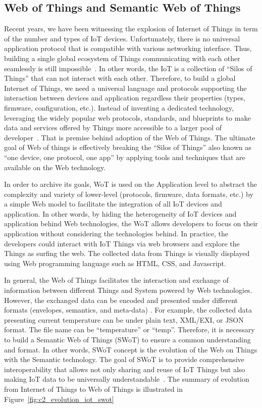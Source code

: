 \subsection{Web of Things and Semantic Web of Things}
Recent years, we have been witnessing the explosion of Internet of Things in term of the number and types of IoT devices. Unfortunately, there is no universal application protocol that is compatible with various networking interface. Thus, building a single global ecosystem of Things communicating with each other seamlessly is still impossible~\cite{WebofThi19:online}. In other words, the IoT is a collection of ``Silos of Things'' that can not interact with each other. Therefore, to build a global Internet of Things, we need a universal language and protocols supporting the interaction between devices and application regardless their properties (types, firmware, configuration, etc.). Instead of inventing a dedicated technology, leveraging the widely popular web protocols, standards, and blueprints to make data and services offered by Things more accessible to a larger pool of developer~\cite{guinard2016building}. That is premise behind adoption of the Web of Things. The ultimate goal of Web of things is effectively breaking the ``Silos of Things'' also known as ``one device, one protocol, one app'' by applying tools and techniques that are available on the Web technology.

In order to archive its goals, WoT is used on the Application level to abstract the complexity and variety of lower-level (protocols, firmware, data formats, etc.) by a simple Web model to facilitate the integration of all IoT devices and application. In other words, by hiding the heterogeneity of IoT devices and application behind Web technologies, the WoT allows developers to focus on their application without considering the technologies behind. In practice, the developers could interact with IoT Things via web browsers and explore the Things as surfing the web. The collected data from Things is visually displayed using Web programming language such as HTML, CSS, and Javascript. 

In general, the Web of Things facilitates the interaction and exchange of information between different Things and System powered by Web technologies. However, the exchanged data can be encoded and presented under different formats (envelopes, semantics, and meta-data) . For example, the collected data presenting current temperature can be under plain text, XML/EXI, or JSON format. The file name can be ``temperature'' or ``temp''. Therefore, it is necessary to build a Semantic Web of Things (SWoT) to ensure a common understanding and format. In other words, SWoT concept is the evolution of the Web on Things with the Semantic technology. The goal of SWoT is to provide comprehensive interoperability that allows not only sharing and reuse of IoT Things but also making IoT data to be universally understandable~\cite{pfisterer2011spitfire}. The summary of evolution from Internet of Things to Web of Things is illustrated in Figure~\ref{fig:c2_evolution_iot_swot}

